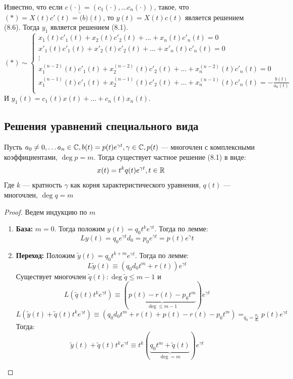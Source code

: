Известно, что если \(c(\cdot) = (c_1(\cdot), \dots c_n(\cdot))\), такое, что \((*) = X(t)c'(t) = \tilde(b)(t)\), то \(y(t) = X(t)c(t)\) является решением (8.6). Тогда \(y_1\) является решением (8.1).
\[(*) \sim \left\{\begin{array}{l}
    x_1(t)c'_1(t) + x_2(t)c'_2(t) + \dots + x_n(t)c'_n(t) = 0 \\
    x'_1(t)c'_1(t) + x'_2(t)c'_2(t) + \dots + x'_n(t)c'_n(t) = 0 \\
    \vdots \\
    x^{(n - 2)}_1(t)c'_1(t) + x^{(n - 2)}_2(t)c'_2(t) + \dots + x^{(n - 2)}_n(t)c'_n(t) = 0 \\
    x^{(n - 1)}_1(t)c'_1(t) + x^{(n - 1)}_2(t)c'_2(t) + \dots + x^{(n - 1)}_n(t)c'_n(t) = -\frac{b(t)}{a_0(t)} \\
\end{array}\right.\]
И \(y_1(t) = c_1(t)x(t) + \dots + c_n(t)x_n(t)\).


\subsection{Решения уравнений специального вида}
\begin{theorem}
    Пусть \(a_0 \ne 0, \dots a_n \in \mathbb{C}, b(t) = p(t)e^{\gamma t}, \gamma \in \mathbb{C}, p(t)\) --- многочлен с комплексными коэффициентами, \(\deg p = m\). Тогда существует частное решение (8.1) в виде:
    \[x(t) = t^kq(t)e^{\gamma t}, t \in \mathbb{R}\]
    Где \(k\) --- кратность \(\gamma\) как корня характеристического уравнения, \(q(t)\) --- многочлен, \(\deg q = m\)
\end{theorem}
\begin{proof}
    Ведем индукцию по \(m\)
    \begin{enumerate}
        \item[] \textbf{База:} \(m = 0\). Тогда положим \(y(t) = q_0t^ke^{\gamma t}\). Тогда по лемме:
        \[Ly(t) = q_0e^{\gamma t}d_0 = p_0e^{\gamma t} = p(t)e{^\gamma t}\]
        \item[] \textbf{Переход:} Положим \(\tilde{y}(t) = q_0t^{k + m}e^{\gamma t}\). Тогда по лемме:
        \[L\tilde{y}(t) \equiv (q_0d_0t^m + r(t))e^{\gamma t}\]
        Существует многочлен \(\tilde{q}(t): \deg \tilde{q} \le m - 1\) и 
        \[L(\tilde{q}(t)t^ke^{\gamma t}) \equiv (\underbrace{p(t) - r(t) - p_0t^m}_{\deg \le m - 1})e^{\gamma t}\]
        \[L(\tilde{y}(t) + \tilde{q}(t)t^ke^{\gamma t}) \equiv (q_0d_0t^m + r(t) + p(t) - r(t) - p_0t^m) =_{q_0 = \frac{p_0}{d_0}} p(t)e^{\gamma t}\]
        Тогда:
        \[\tilde{y}(t) + \tilde{q}(t)t^ke^{\gamma t} \equiv t^k(\underbrace{q_0t^m + \tilde{q}(t)}_{\deg = m})e^{\gamma t}\]
    \end{enumerate}
\end{proof}


